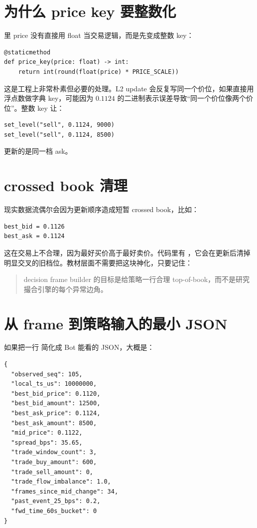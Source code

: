 \section{为什么 price key 要整数化}

 里 price 没有直接用 float 当交易逻辑，而是先变成整数 key：

\begin{lstlisting}
@staticmethod
def price_key(price: float) -> int:
    return int(round(float(price) * PRICE_SCALE))
\end{lstlisting}

这是工程上非常朴素但必要的处理。L2 update 会反复写同一个价位，如果直接用浮点数做字典 key，可能因为 \(0.1124\) 的二进制表示误差导致“同一个价位像两个价位”。整数 key 让：

\begin{lstlisting}
set_level("sell", 0.1124, 9000)
set_level("sell", 0.1124, 8500)
\end{lstlisting}

更新的是同一档 ask。

\section{crossed book 清理}

现实数据流偶尔会因为更新顺序造成短暂 crossed book，比如：

\begin{lstlisting}
best_bid = 0.1126
best_ask = 0.1124
\end{lstlisting}

这在交易上不合理，因为最好买价高于最好卖价。代码里有 ，它会在更新后清掉明显交叉的旧档位。教材层面不需要把这块神化，只要记住：

\begin{quote}
decision frame builder 的目标是给策略一行合理 top-of-book，而不是研究撮合引擎的每个异常边角。
\end{quote}

\section{从 frame 到策略输入的最小 JSON}

如果把一行  简化成 Bot 能看的 JSON，大概是：

\begin{lstlisting}
{
  "observed_seq": 105,
  "local_ts_us": 10000000,
  "best_bid_price": 0.1120,
  "best_bid_amount": 12500,
  "best_ask_price": 0.1124,
  "best_ask_amount": 8500,
  "mid_price": 0.1122,
  "spread_bps": 35.65,
  "trade_window_count": 3,
  "trade_buy_amount": 600,
  "trade_sell_amount": 0,
  "trade_flow_imbalance": 1.0,
  "frames_since_mid_change": 34,
  "past_event_25_bps": 0.2,
  "fwd_time_60s_bucket": 0
}
\end{lstlisting}

